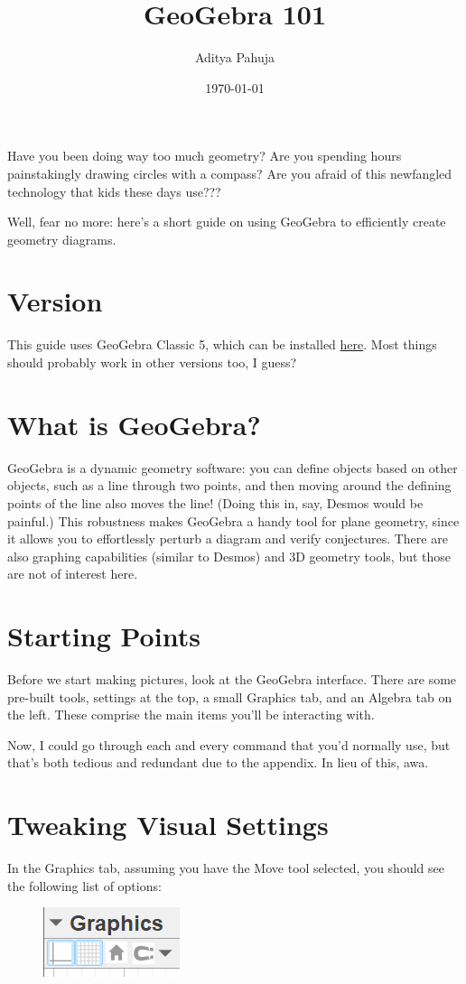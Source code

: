 \documentclass{scrartcl}
\title{GeoGebra 101}
\author{Aditya Pahuja}
\date{\today}
\begin{document}
\maketitle

Have you been doing way too much geometry?
Are you spending hours painstakingly drawing circles with a compass?
Are you afraid of this newfangled technology that kids these days use???

Well, fear no more: here's a short guide on using GeoGebra
to efficiently create geometry diagrams.

\tableofcontents
\pagebreak

\section{Version}
This guide uses GeoGebra Classic 5,
which can be installed \href{https://www.geogebra.org/download}{here}.
Most things should probably work in other versions too, I guess?

\section{What is GeoGebra?}
GeoGebra is a dynamic geometry software:
you can define objects based on other objects,
such as a line through two points,
and then moving around the defining points of the line
also moves the line! (Doing this in, say, Desmos would be painful.)
This robustness makes GeoGebra a handy tool for plane geometry,
since it allows you to effortlessly perturb a diagram and verify conjectures.
There are also graphing capabilities (similar to Desmos) and 3D geometry tools,
but those are not of interest here.

\section{Starting Points}
Before we start making pictures, look at the GeoGebra interface.
There are some pre-built tools, settings at the top,
a small Graphics tab, and an Algebra tab on the left.
These comprise the main items you'll be interacting with.

Now, I could go through each and every command that you'd normally use,
but that's both tedious and redundant due to the appendix.
In lieu of this, awa.

\section{Tweaking Visual Settings}
In the Graphics tab, assuming you have the Move tool selected,
you should see the following list of options:
\begin{figure}[h]
	\centering
	\includegraphics[width=0.2\linewidth]{toggleGridAxes}
	\label{fig:togglegridaxes}
\end{figure}
\end{document}
